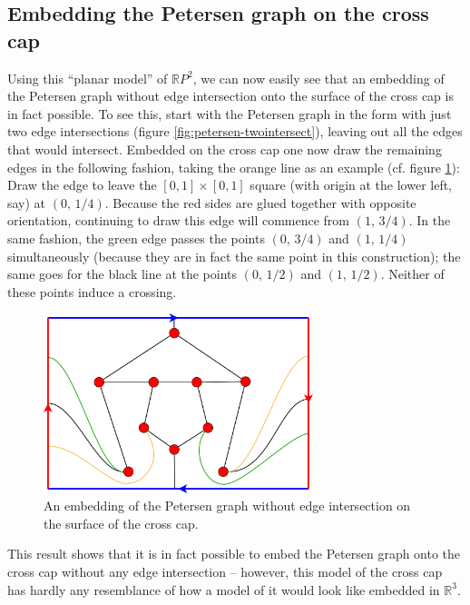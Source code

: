 \documentclass[12pt,            %
               a4paper,         %
               oneside,         %
               DIV12,           %
               fleqn,           %
               halfparskip,     %
               nochapterprefix, %
              ]{scrartcl} %
\theoremstyle{definition}
\begin{document}
\subsection{Embedding the Petersen graph on the cross cap}

Using this “planar model” of $\mathbb{R}P^2$, we can now easily see
that an embedding of the Petersen graph without edge intersection onto
the surface of the cross cap is in fact possible. To see this, start
with the Petersen graph in the form with just two edge intersections
(figure \ref{fig:petersen-twointersect}), leaving out all the edges
that would intersect. Embedded on the cross cap one now draw the
remaining edges in the following fashion, taking the orange line as an
example (cf. figure \ref{fig:rp2-embedding}): Draw the edge to leave
the $[0,1]\times[0,1]$ square (with origin at the lower left, say) at
$(0,\,1/4)$. Because the red sides are glued together with opposite
orientation, continuing to draw this edge will commence from
$(1,\,3/4)$. In the same fashion, the green edge passes the points
$(0,\,3/4)$ and $(1,\,1/4)$ simultaneously (because they are in fact the
same point in this construction); the same goes for the black line at
the points $(0,\,1/2)$ and $(1,\,1/2)$. Neither of these points induce a
crossing.

\begin{figure}[h]
  \centering
  \includegraphics[keepaspectratio=true,width=0.7\textwidth]{../planar-graphs/crosscap-embedding-5.pdf}
  \caption{An embedding of the Petersen graph without edge
    intersection on the surface of the cross cap.}
  \label{fig:rp2-embedding}
\end{figure}

This result shows that it is in fact possible to embed the Petersen
graph onto the cross cap without any edge intersection -- however,
this model of the cross cap has hardly any resemblance of how a model
of it would look like embedded in $\mathbb{R}^3$.


\newpage
\nocite{*}


\end{document}
